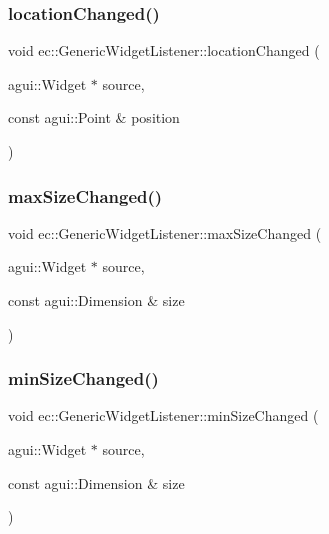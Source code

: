 \subsubsection{\texorpdfstring{location\+Changed()}{locationChanged()}}
{\footnotesize\ttfamily void ec\+::\+Generic\+Widget\+Listener\+::location\+Changed (\begin{DoxyParamCaption}\item[{agui\+::\+Widget $\ast$}]{source,  }\item[{const agui\+::\+Point \&}]{position }\end{DoxyParamCaption})\hspace{0.3cm}{\ttfamily [override]}}

\mbox{\label{classec_1_1_generic_widget_listener_ae1341f57e8a72d4222d855031301f346}} 
\subsubsection{\texorpdfstring{max\+Size\+Changed()}{maxSizeChanged()}}
{\footnotesize\ttfamily void ec\+::\+Generic\+Widget\+Listener\+::max\+Size\+Changed (\begin{DoxyParamCaption}\item[{agui\+::\+Widget $\ast$}]{source,  }\item[{const agui\+::\+Dimension \&}]{size }\end{DoxyParamCaption})\hspace{0.3cm}{\ttfamily [override]}}

\mbox{\label{classec_1_1_generic_widget_listener_af3cb291bf020116053ee7955d40bc786}} 
\subsubsection{\texorpdfstring{min\+Size\+Changed()}{minSizeChanged()}}
{\footnotesize\ttfamily void ec\+::\+Generic\+Widget\+Listener\+::min\+Size\+Changed (\begin{DoxyParamCaption}\item[{agui\+::\+Widget $\ast$}]{source,  }\item[{const agui\+::\+Dimension \&}]{size }\end{DoxyParamCaption})\hspace{0.3cm}{\ttfamily [override]}}


